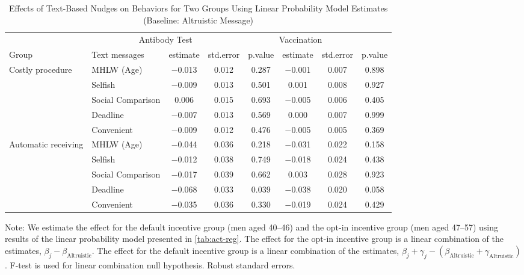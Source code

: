 \begin{table}

\caption{Effects of Text-Based Nudges on Behaviors for Two Groups Using Linear Probability Model Estimates (Baseline: Altruistic Message) \label{tab:act-reg-ftest2}}
\centering
\fontsize{9}{11}\selectfont
\begin{threeparttable}
\begin{tabular}[t]{>{\raggedright\arraybackslash}p{5em}lcccccc}
\toprule
\multicolumn{2}{c}{ } & \multicolumn{3}{c}{Antibody Test} & \multicolumn{3}{c}{Vaccination} \\
\cmidrule(l{3pt}r{3pt}){3-5} \cmidrule(l{3pt}r{3pt}){6-8}
Group & Text messages & estimate & std.error & p.value & estimate  & std.error  & p.value \\
\midrule
Costly procedure & MHLW (Age) & \num{-0.013} & \num{0.012} & \num{0.287} & \num{-0.001} & \num{0.007} & \num{0.898}\\
 & Selfish & \num{-0.009} & \num{0.013} & \num{0.501} & \num{0.001} & \num{0.008} & \num{0.927}\\
 & Social Comparison & \num{0.006} & \num{0.015} & \num{0.693} & \num{-0.005} & \num{0.006} & \num{0.405}\\
 & Deadline & \num{-0.007} & \num{0.013} & \num{0.569} & \num{0.000} & \num{0.007} & \num{0.999}\\
 & Convenient & \num{-0.009} & \num{0.012} & \num{0.476} & \num{-0.005} & \num{0.005} & \num{0.369}\\
Automatic receiving & MHLW (Age) & \num{-0.044} & \num{0.036} & \num{0.218} & \num{-0.031} & \num{0.022} & \num{0.158}\\
 & Selfish & \num{-0.012} & \num{0.038} & \num{0.749} & \num{-0.018} & \num{0.024} & \num{0.438}\\
 & Social Comparison & \num{-0.017} & \num{0.039} & \num{0.662} & \num{0.003} & \num{0.028} & \num{0.923}\\
 & Deadline & \num{-0.068} & \num{0.033} & \num{0.039} & \num{-0.038} & \num{0.020} & \num{0.058}\\
 & Convenient & \num{-0.035} & \num{0.036} & \num{0.330} & \num{-0.019} & \num{0.024} & \num{0.429}\\
\bottomrule
\end{tabular}
\begin{tablenotes}
\item Note: We estimate the effect for the default incentive group (men aged 40--46) and the opt-in incentive group (men aged 47--57) using results of the linear probability model presented in \ref{tab:act-reg}. The effect for the opt-in incentive group is a linear combination of the estimates, $\beta_j - \beta_{\text{Altruistic}}$. The effect for the default incentive group is a linear combination of the estimates, $\beta_j + \gamma_j - (\beta_{\text{Altruistic}} + \gamma_{\text{Altruistic}})$.  F-test is used for linear combination null hypothesis. Robust standard errors.
\end{tablenotes}
\end{threeparttable}
\end{table}
